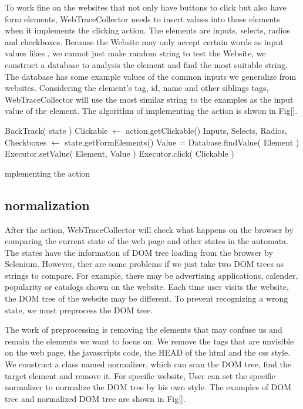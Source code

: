 To work fine on the websites that not only have buttons to click but also have form elements,
WebTraceCollector needs to insert values into those elements when it implements the clicking action.
The elements are inputs, selects, radios and checkboxes.
Because the Website may only accept certain words as input values likes , we cannot just make random string to test the Website,
we construct a database to analysis the element and find the most suitable string.
The database has some example values of the common inputs we generalize from websites.
Considering the element's tag, id, name and other siblings tags,
WebTraceCollector will use the most similar string to the examples as the input value of the element.
The algorithm of implementing the action is shwon in Fig[].


\begin{algorithm}[htb]
	\begin{doublespace}		
		{
			BackTrack( state )\;
		}
		Clickable $\gets$ action.getClickable()\;
		Inputs, Selects, Radios, Checkboxes $\gets$ state.getFormElements()\;
		{
			Value = Database.findValue( Element )\;
			Executor.setValue( Element, Value )\;
		}
		Executor.click( Clickable )\;
		
	\end{doublespace}
	\caption{mplementing the action}
	\label{algorithm:action}
\end{algorithm} 

\subsection{normalization}

After the action, WebTraceCollector will check what happens on the browser by comparing the current state of the web page and other states in the automata.
The states have the information of DOM tree loading from the browser by Selenium.
However, ther are some problems if we just take two DOM trees as strings to compare.
For example, there may be advertising applications, calender, popularity or catalogs shown on the website.
Each time user visits the website, the DOM tree of the website may be different.
To prevent recognizing a wrong state, we must preprocess the DOM tree.

The work of preprocessing is removing the elements that may confuse us and remain the elements we want to focus on.
We remove the tags that are unvisible on the web page, the javascripts code, the HEAD of the html and the css style.
We construct a class named normalizer, which can scan the DOM tree, find the target element and remove it.
For specific website, User can set the specific normalizer to normalize the DOM tree by his own style.
The examples of DOM tree and normalized DOM tree are shown in Fig[].

